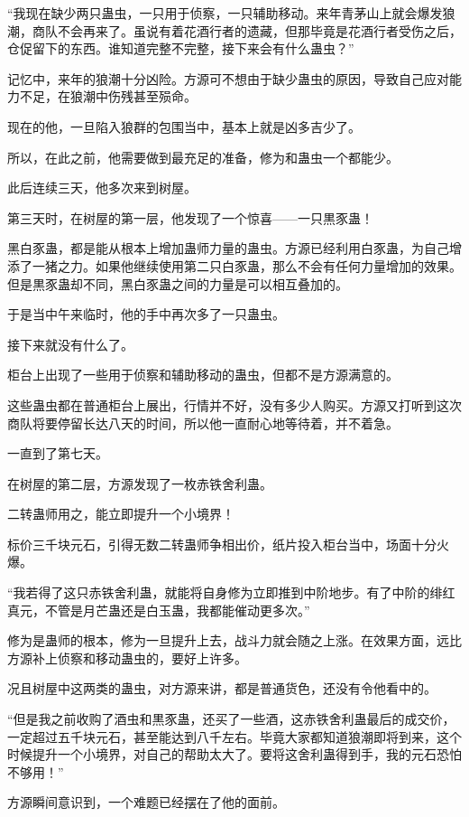 \begin{this_body}
“我现在缺少两只蛊虫，一只用于侦察，一只辅助移动。来年青茅山上就会爆发狼潮，商队不会再来了。虽说有着花酒行者的遗藏，但那毕竟是花酒行者受伤之后，仓促留下的东西。谁知道完整不完整，接下来会有什么蛊虫？”

记忆中，来年的狼潮十分凶险。方源可不想由于缺少蛊虫的原因，导致自己应对能力不足，在狼潮中伤残甚至殒命。

现在的他，一旦陷入狼群的包围当中，基本上就是凶多吉少了。

所以，在此之前，他需要做到最充足的准备，修为和蛊虫一个都能少。

此后连续三天，他多次来到树屋。

第三天时，在树屋的第一层，他发现了一个惊喜——一只黒豕蛊！

黑白豕蛊，都是能从根本上增加蛊师力量的蛊虫。方源已经利用白豕蛊，为自己增添了一猪之力。如果他继续使用第二只白豕蛊，那么不会有任何力量增加的效果。但是黒豕蛊却不同，黑白豕蛊之间的力量是可以相互叠加的。

于是当中午来临时，他的手中再次多了一只蛊虫。

接下来就没有什么了。

柜台上出现了一些用于侦察和辅助移动的蛊虫，但都不是方源满意的。

这些蛊虫都在普通柜台上展出，行情并不好，没有多少人购买。方源又打听到这次商队将要停留长达八天的时间，所以他一直耐心地等待着，并不着急。

一直到了第七天。

在树屋的第二层，方源发现了一枚赤铁舍利蛊。

二转蛊师用之，能立即提升一个小境界！

标价三千块元石，引得无数二转蛊师争相出价，纸片投入柜台当中，场面十分火爆。

“我若得了这只赤铁舍利蛊，就能将自身修为立即推到中阶地步。有了中阶的绯红真元，不管是月芒蛊还是白玉蛊，我都能催动更多次。”

修为是蛊师的根本，修为一旦提升上去，战斗力就会随之上涨。在效果方面，远比方源补上侦察和移动蛊虫的，要好上许多。

况且树屋中这两类的蛊虫，对方源来讲，都是普通货色，还没有令他看中的。

“但是我之前收购了酒虫和黒豕蛊，还买了一些酒，这赤铁舍利蛊最后的成交价，一定超过五千块元石，甚至能达到八千左右。毕竟大家都知道狼潮即将到来，这个时候提升一个小境界，对自己的帮助太大了。要将这舍利蛊得到手，我的元石恐怕不够用！”

方源瞬间意识到，一个难题已经摆在了他的面前。

\end{this_body}


